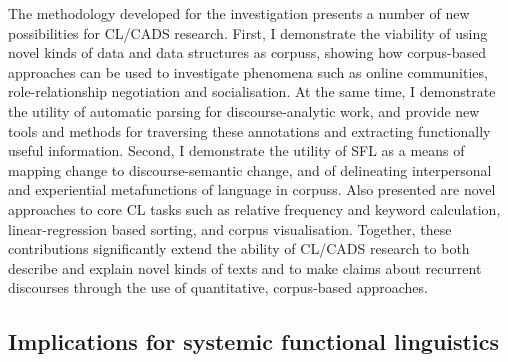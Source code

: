 The methodology developed for the investigation presents a number of new possibilities for \gls{CL}\slash \gls{CADS} research. First, I demonstrate the viability of using novel kinds of data and data structures as \glspl{corpus}, showing how corpus\hyp{}based approaches can be used to investigate phenomena such as online communities, role\hyp{}relationship negotiation and socialisation. At the same time, I demonstrate the utility of automatic parsing for discourse\hyp{}analytic work, and provide new tools and methods for traversing these annotations and extracting functionally useful information. Second, I demonstrate the utility of \gls{SFL} as a means of mapping  change to \gls{discourse-semantic} change, and of delineating interpersonal and experiential metafunctions of language in \glspl{corpus}. Also presented are novel approaches to core \gls{CL} tasks such as relative frequency and keyword calculation, linear\hyp{}regression based sorting, and \gls{corpus} visualisation. Together, these contributions significantly extend the ability of \gls{CL}\slash \gls{CADS} research to both describe and explain novel kinds of texts and to make claims about recurrent discourses through the use of quantitative, corpus\hyp{}based approaches. %

\subsection{Implications for systemic functional linguistics}

